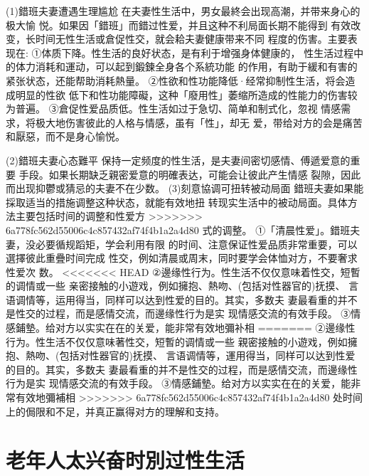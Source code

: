 \documentclass[12pt,UTF8]{ctexbook}
\begin{document}
(1)錯班夫妻遭遇生理尴尬
在夫妻性生活中，男女最終会出现高潮，并带来身心的极大愉
悦。如果因「錯班」而錯过性爱，并且这种不利局面长期不能得到
有效改变，长时间无性生活或倉促性交，就会耠夫妻健康带来不同
程度的伤害。主要表现在:
①体质下降。性生活的良好状态，是有利于增强身体健康的，
性生活过程中的体力消耗和運动，可以起到鍛鍊全身各个系統功能
的作用，有助于緩和有害的紧张状态，还能帮助消耗熱量。
②性欲和性功能降低·经常抑制性生活，将会造成明显的性欲
低下和性功能障礙，这种「廢用性」萎缩所造成的性能力的伤害较
为普遍。
③倉促性爱品质低。性生活如过于急切、简单和制式化，忽视
情感需求，将极大地伤害彼此的人格与情感，虽有「性」，却无
爱，带给对方的会是痛苦和厭惡，而不是身心愉悦。

(2)錯班夫妻心态難平
保持一定频度的性生活，是夫妻间密切感情、傅遞爱意的重要
手段。如果长期缺乏親密爱意的明確表达，可能会让彼此产生情感
裂隙，因此而出现抑鬱或猜忌的夫妻不在少数。
(3)刻意協调可扭转被动局面
錯班夫妻如果能採取适当的措施调整这种状态，就能有效地扭
转现实生活中的被动局面。具体方法主要包括时间的调整和性爱方
>>>>>>> 6a778fc562d55006c4c857432af74f4b1a2a4d80
式的调整。
①「清晨性爱」。錯班夫妻，没必要循规蹈矩，学会利用有限
的时间、注意保证性爱品质非常重要，可以選擇彼此重疊时间完成
性交，例如清晨或周末，同时要学会体恤对方，不要奢求性爱次
数。
<<<<<<< HEAD
②邊缘性行为。性生活不仅仅意味着性交，短暫的调情或一些
亲密接触的小遊戏，例如擁抱、熱吻、(包括对性器官的)抚摸、
言语调情等，运用得当，同样可以达到性爱的目的。其实，多数夫
妻最看重的并不是性交的过程，而是感情交流，而邊缘性行为是实
现情感交流的有效手段。
③情感鋪墊。给对方以实实在在的关爱，能非常有效地彌补相
=======
②邊缘性行为。性生活不仅仅意味著性交，短暫的调情或一些
親密接触的小遊戏，例如擁抱、熱吻、(包括对性器官的)抚摸、
言语调情等，運用得当，同样可以达到性爱的目的。其实，多数夫
妻最看重的并不是性交的过程，而是感情交流，而邊缘性行为是实
现情感交流的有效手段。
③情感鋪墊。给对方以实实在在的关爱，能非常有效地彌補相
>>>>>>> 6a778fc562d55006c4c857432af74f4b1a2a4d80
处时间上的侷限和不足，并真正赢得对方的理解和支持。


\section{老年人太兴奋时別过性生活}
\end{document}

